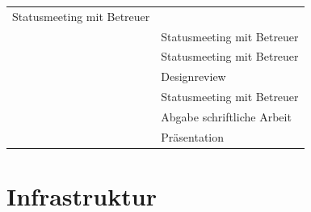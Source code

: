 \begin{longtable}[c]{@{}ll@{}}
\begin{minipage}[t]{0.47\columnwidth}
Statusmeeting mit Betreuer
\strut\end{minipage}\tabularnewline
\begin{minipage}[t]{0.16\columnwidth}\raggedright\strut
\strut\end{minipage} &
\begin{minipage}[t]{0.47\columnwidth}\raggedright\strut
Statusmeeting mit Betreuer
\strut\end{minipage}\tabularnewline
\begin{minipage}[t]{0.16\columnwidth}\raggedright\strut
\strut\end{minipage} &
\begin{minipage}[t]{0.47\columnwidth}\raggedright\strut
Statusmeeting mit Betreuer
\strut\end{minipage}\tabularnewline
\begin{minipage}[t]{0.16\columnwidth}\raggedright\strut
\strut\end{minipage} &
\begin{minipage}[t]{0.47\columnwidth}\raggedright\strut
Designreview
\strut\end{minipage}\tabularnewline
\begin{minipage}[t]{0.16\columnwidth}\raggedright\strut
\strut\end{minipage} &
\begin{minipage}[t]{0.47\columnwidth}\raggedright\strut
Statusmeeting mit Betreuer
\strut\end{minipage}\tabularnewline
\begin{minipage}[t]{0.16\columnwidth}\raggedright\strut
\strut\end{minipage} &
\begin{minipage}[t]{0.47\columnwidth}\raggedright\strut
Abgabe schriftliche Arbeit
\strut\end{minipage}\tabularnewline
\begin{minipage}[t]{0.16\columnwidth}\raggedright\strut
\strut\end{minipage} &
\begin{minipage}[t]{0.47\columnwidth}\raggedright\strut
Präsentation
\strut\end{minipage}\tabularnewline
\bottomrule
\end{longtable}

\newpage

\section{Infrastruktur}\label{infrastruktur}

